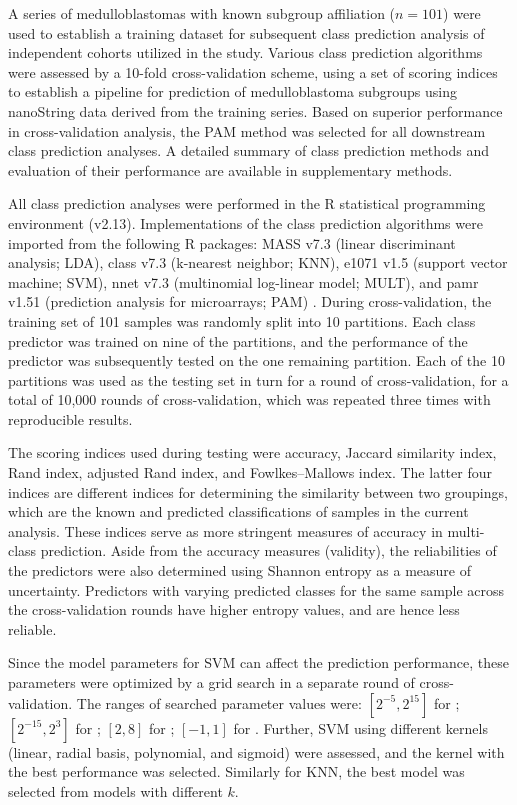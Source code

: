 A series of medulloblastomas with known subgroup affiliation ($n = 101$) were used to establish a training dataset for subsequent class prediction analysis of independent cohorts utilized in the study.  Various class prediction algorithms were assessed by a 10-fold cross-validation scheme, using a set of scoring indices to establish a pipeline for prediction of medulloblastoma subgroups using nanoString data derived from the training series.  Based on superior performance in cross-validation analysis, the PAM method was selected for all downstream class prediction analyses.  A detailed summary of class prediction methods and evaluation of their performance are available in supplementary methods.

All class prediction analyses were performed in the R statistical programming environment (v2.13). Implementations of the class prediction algorithms were imported
from the following R packages: MASS v7.3 (linear discriminant analysis; LDA), class v7.3 (k-nearest neighbor; KNN), e1071 v1.5 (support vector machine; SVM), nnet v7.3 (multinomial log-linear model; MULT), and pamr v1.51 (prediction analysis for microarrays; PAM) . During cross-validation, the training set of 101 samples was randomly split into 10 partitions. Each class predictor was trained on nine of the partitions, and the performance of the predictor was subsequently tested on the one remaining partition. Each of the 10 partitions was used as the testing set in turn for a round of cross-validation, for a total of 10,000 rounds of cross-validation, which was
repeated three times with reproducible results.

The scoring indices used during testing were accuracy, Jaccard similarity index, Rand index, adjusted Rand index, and Fowlkes–Mallows index. The latter four indices are different indices for determining the similarity between
two groupings, which are the known and predicted classifications of samples in the current analysis. These indices serve as more stringent measures of accuracy in multi-class prediction. Aside from the accuracy measures (validity),
the reliabilities of the predictors were also determined using Shannon entropy as a measure of uncertainty. Predictors with varying predicted classes for the same sample across the cross-validation rounds have higher entropy values, and are hence less reliable.

Since the model parameters for SVM can affect the prediction performance, these parameters were optimized by a grid search in a separate round of cross-validation. The ranges of searched parameter values were: $[2^{-5}, 2^{15}]$ for ; $[2^{-15}, 2^3]$ for ; $[2, 8]$ for ; $[-1, 1]$ for . Further, SVM using different kernels (linear, radial basis, polynomial, and sigmoid) were assessed, and the kernel with the best performance was selected. Similarly for KNN, the best model was selected from models with different $k$.

